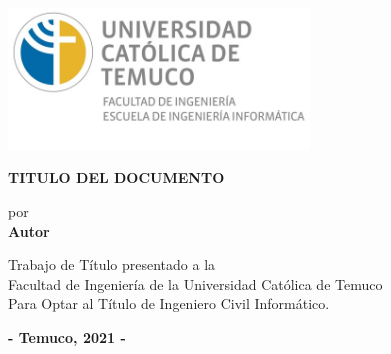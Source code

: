 \documentclass[12pt]{article}
\begin{document}
\begin{titlepage}
        \vspace{-1.0cm}
       \includegraphics[width=0.6\textwidth]{images/LOGO.jpg}
   \begin{center}
       \vspace*{2cm}

       \textbf{TITULO DEL DOCUMENTO}

       \vspace{0.5cm}
       \vspace{4cm}
        por\\
       \textbf{Autor}

       \vfill
            Trabajo de Título presentado a la\\
Facultad de Ingeniería de la Universidad Católica de Temuco\\
Para Optar al Título de Ingeniero Civil Informático.
            
     
            
       \textbf{- Temuco, 2021 -}
      \vspace{-1cm}
            
   \end{center}
\end{titlepage}
\newpage
\tableofcontents
\newpage
\listoftables
\listoffigures
\end{document}
